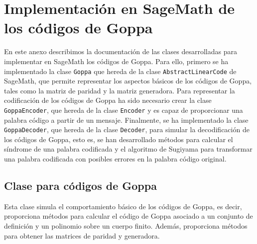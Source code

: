 \chapter[Implementación en SageMath de los códigos de Goppa]{Implementación en SageMath de los códigos de Goppa}
\label{annex:sage-Goppa}

En este anexo describimos la documentación de las clases desarrolladas para implementar en SageMath los códigos de Goppa. Para ello, primero se ha implementado la clase \texttt{Goppa} que hereda de la clase \texttt{AbstractLinearCode} de SageMath, que permite representar los aspectos básicos de los códigos de Goppa, tales como la matriz de paridad y la matriz generadora. Para representar la codificación de los códigos de Goppa ha sido necesario crear la clase \texttt{GoppaEncoder}, que hereda de la clase \texttt{Encoder} y es capaz de proporcionar una palabra código a partir de un mensaje. Finalmente, se ha implementado la clase \texttt{GoppaDecoder}, que hereda de la clase \texttt{Decoder}, para simular la decodificación de los códigos de Goppa, esto es, se han desarrollado métodos para calcular el síndrome de una palabra codificada y el algoritmo de Sugiyama para transformar una palabra codificada con posibles errores en la palabra código original.


\section{Clase para códigos de Goppa}

Esta clase simula el comportamiento básico de los códigos de Goppa, es decir, proporciona métodos para calcular el código de Goppa asociado a un conjunto de definición y un polinomio sobre un cuerpo finito. Además, proporciona métodos para obtener las matrices de paridad y generadora.

